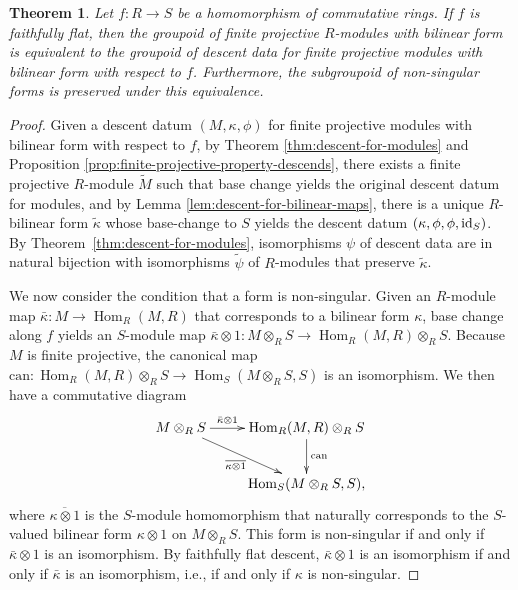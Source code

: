 \documentclass[pdftex]{sigma}
\DeclareMathOperator{\Hom}{Hom}
\newtheorem{thm}{Theorem}[section]
\theoremstyle{definition}
\begin{document}
\begin{thm} \label{thm:descent-for-finite-projective-modules-with-bilinear-form}
Let $f\colon R \to S$ be a homomorphism of commutative rings. If $f$ is faithfully flat, then the groupoid of finite projective $R$-modules with bilinear form is equivalent to the groupoid of descent data for finite projective modules with bilinear form with respect to $f$. Furthermore, the subgroupoid of non-singular forms is preserved under this equivalence.
\end{thm}
\begin{proof}Given a descent datum $(M, \kappa, \phi)$ for finite projective modules with bilinear form with respect to $f$, by Theorem \ref{thm:descent-for-modules} and Proposition \ref{prop:finite-projective-property-descends}, there exists a finite projective $R$-module $\tilde{M}$ such that base change yields the original descent datum for modules, and by Lemma \ref{lem:descent-for-bilinear-maps}, there is a unique $R$-bilinear form $\tilde{\kappa}$ whose base-change to $S$ yields the descent datum $(\kappa, \phi, \phi, {\rm id}_S)$. By Theorem~\ref{thm:descent-for-modules}, isomorphisms $\psi$ of descent data are in natural bijection with isomorphisms $\tilde{\psi}$ of $R$-modules that preserve $\tilde{\kappa}$.

We now consider the condition that a form is non-singular. Given an $R$-module map $\bar{\kappa}\colon M \to \Hom_R(M,R)$ that corresponds to a bilinear form $\kappa$, base change along $f$ yields an $S$-module map $\bar{\kappa} \otimes 1\colon M \otimes_{R} S \to \Hom_R(M,R) \otimes_{R} S$. Because $M$ is finite projective, the canonical map $\mathrm{can}\colon \Hom_R(M,R) \otimes_{R} S \to \Hom_S(M \otimes_{R} S, S)$ is an isomorphism. We then have a commutative diagram
\begin{gather*} \xymatrix{ M \otimes_{R} S \ar[r]^-{\bar{\kappa} \otimes 1} \ar[rd]_-{\overline{\kappa\otimes 1}} & \Hom_R(M,R) \otimes_{R} S \ar[d]^{\mathrm{can}} \\ & \Hom_S(M \otimes_{R} S, S), } \end{gather*}
where $\overline{\kappa\otimes 1}$ is the $S$-module homomorphism that naturally corresponds to the $S$-valued bilinear form $\kappa \otimes 1$ on $M \otimes_{R} S$. This form is non-singular if and only if $\bar{\kappa} \otimes 1$ is an isomorphism. By faithfully flat descent, $\bar{\kappa} \otimes 1$ is an isomorphism if and only if $\bar{\kappa}$ is an isomorphism, i.e., if and only if $\kappa$ is non-singular.
\end{proof}
\end{document}
